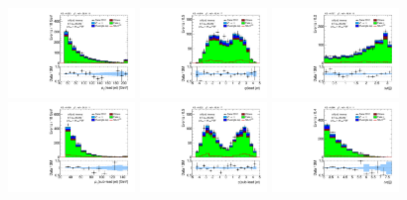 \clearpage

\begin{figure}[tp]
  \centering
  \includegraphics[width=0.30\textwidth]{figures/analysis/vbf-WlvCR/jet-1-pt}
  \includegraphics[width=0.30\textwidth]{figures/analysis/vbf-WlvCR/jet-1-eta}
  \includegraphics[width=0.30\textwidth]{figures/analysis/vbf-WlvCR/jets-dphi} \\
  \includegraphics[width=0.30\textwidth]{figures/analysis/vbf-WlvCR/jet-2-pt}
  \includegraphics[width=0.30\textwidth]{figures/analysis/vbf-WlvCR/jet-2-eta}
  \includegraphics[width=0.30\textwidth]{figures/analysis/vbf-WlvCR/jets-deta} \\

\end{figure}
